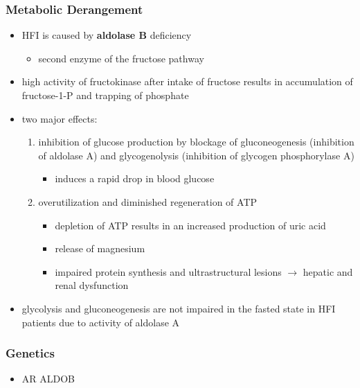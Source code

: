 \documentclass[12pt]{scrartcl}
\begin{document}
\subsubsection{Metabolic Derangement}
\label{sec:org413635e}
\begin{itemize}
\item HFI is caused by \textbf{aldolase B} deficiency
\begin{itemize}
\item second enzyme of the fructose pathway
\end{itemize}
\end{itemize}


\begin{itemize}
\item high activity of fructokinase after intake of fructose results in
accumulation of fructose-1-P and trapping of phosphate
\item two major effects:
\begin{enumerate}
\item inhibition of glucose production by blockage of gluconeogenesis
(inhibition of aldolase A) and glycogenolysis (inhibition of glycogen phosphorylase A)
\begin{itemize}
\item induces a rapid drop in blood glucose
\end{itemize}
\item overutilization and diminished regeneration of ATP
\begin{itemize}
\item depletion of ATP results in an increased production of uric acid
\item release of magnesium
\item impaired protein synthesis and ultrastructural lesions \(\to\)
hepatic and renal dysfunction
\end{itemize}
\end{enumerate}
\item glycolysis and gluconeogenesis are not impaired in the fasted state
in HFI patients due to activity of aldolase A
\end{itemize}

\subsubsection{Genetics}
\label{sec:org56ca583}
\begin{itemize}
\item AR ALDOB
\end{itemize}
\end{document}
